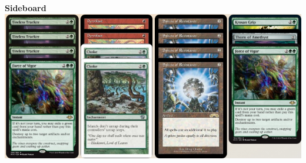 \documentclass{report}
\begin{document}

\begin{center}
\textbf{Sideboard}
\includegraphics [width =\textwidth] {rgdecklistsb}
\end{center}
\end{document}
